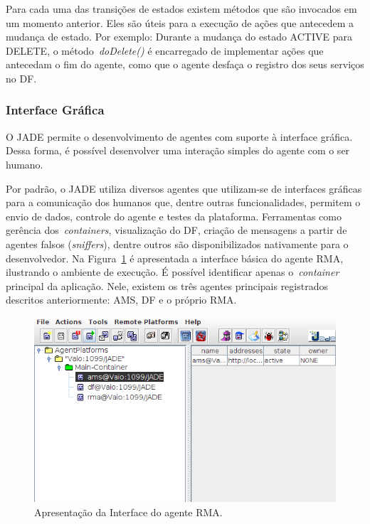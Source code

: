 Para cada uma das transições de estados existem métodos que são invocados em um momento anterior. Eles são úteis para a execução de ações que antecedem a mudança de estado. Por exemplo: Durante a mudança do estado ACTIVE para DELETE, o método~\emph{doDelete()} é encarregado de implementar ações que antecedam o fim do agente, como que o agente desfaça o registro dos seus serviços no DF.

\subsubsection{Interface Gráfica}
O JADE permite o desenvolvimento de agentes com suporte à interface gráfica. Dessa forma, é possível desenvolver uma interação simples do agente com o ser humano.

Por padrão, o JADE utiliza diversos agentes que utilizam-se de interfaces gráficas para a comunicação dos humanos que, dentre outras funcionalidades, permitem o envio de dados, controle do agente e testes da plataforma. Ferramentas como gerência dos~\emph{containers}, visualização do DF, criação de mensagens a partir de agentes falsos (\emph{sniffers}), dentre outros são disponibilizados nativamente para o desenvolvedor. Na Figura~\ref{fig:tela-jade} é apresentada a interface básica do agente RMA, ilustrando o ambiente de execução. É possível identificar apenas o~\emph{container} principal da aplicação. Nele, existem os três agentes principais registrados descritos anteriormente: AMS, DF e o próprio RMA.

\begin{figure}
	\centering
	\includegraphics[scale=0.65]{images/tela-jade.png}
	\caption{Apresentação da Interface do agente RMA.}
	\label{fig:tela-jade}
\end{figure}

